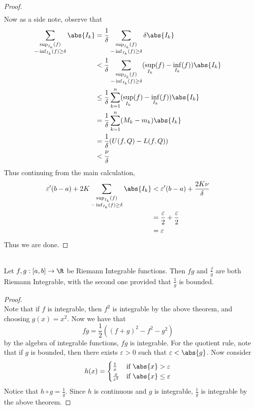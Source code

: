 \documentclass[a4paper]{article}
\begin{document}
\begin{thm}{}{}
\begin{proof}
\begin{align*}
\end{align*}
Now as a side note, observe that
\begin{align*}
\sum_{\substack{\sup_{I_k}(f)\\-\inf_{I_k}(f)\geq\delta}}\abs{I_k}&=\frac{1}{\delta}\sum_{\substack{\sup_{I_k}(f)\\-\inf_{I_k}(f)\geq\delta}}\delta\abs{I_k}\\
&<\frac{1}{\delta}\sum_{\substack{\sup_{I_k}(f)\\-\inf_{I_k}(f)\geq\delta}}(\sup_{I_k}(f)-\inf_{I_k}(f))\abs{I_k}\\
&\leq\frac{1}{\delta}\sum_{k=1}^n(\sup_{I_k}(f)-\inf_{I_k}(f))\abs{I_k}\\
&=\frac{1}{\delta}\sum_{k=1}^n(M_k-m_k)\abs{I_k}\\
&=\frac{1}{\delta}(U(f,Q)-L(f,Q))\\
&<\frac{\nu}{\delta}
\end{align*}
Thus continuing from the main calculation, 
\begin{align*}
\varepsilon'(b-a)+2K\sum_{\substack{\sup_{I_k}(f)\\-\inf_{I_k}(f)\geq\delta}}\abs{I_k}&<\varepsilon'(b-a)+\frac{2K\nu}{\delta}\\
&=\frac{\varepsilon}{2}+\frac{\varepsilon}{2}\\
&=\varepsilon
\end{align*}
Thus we are done. 
\end{proof}
\end{thm}

\begin{thm}{}{}\\ Let $f,g:[a,b]\to\R$ be Riemann Integrable functions. Then $fg$ and $\frac{f}{g}$ are both Riemann Integrable, with the second one provided that $\frac{1}{g}$ is bounded. 
\begin{proof}\\ Note that if $f$ is integrable, then $f^2$ is integrable by the above theorem, and choosing $g(x)=x^2$. Now we have that $$fg=\frac{1}{2}((f+g)^2-f^2-g^2)$$ by the algebra of integrable functions, $fg$ is integrable. For the quotient rule, note that if $g$ is bounded, then there exists $\varepsilon>0$ such that $\varepsilon<\abs{g}$. Now consider $$h(x)=\begin{cases}
\frac{1}{x} & \text{if $\abs{x}>\varepsilon$}\\
\frac{x}{\varepsilon^2} & \text{if $\abs{x}\leq\varepsilon$}
\end{cases}$$
Notice that $h\circ g=\frac{1}{g}$. Since $h$ is continuous and $g$ is integrable, $\frac{1}{g}$ is integrable by the above theorem. 
\end{proof}
\end{thm}
\end{document}
